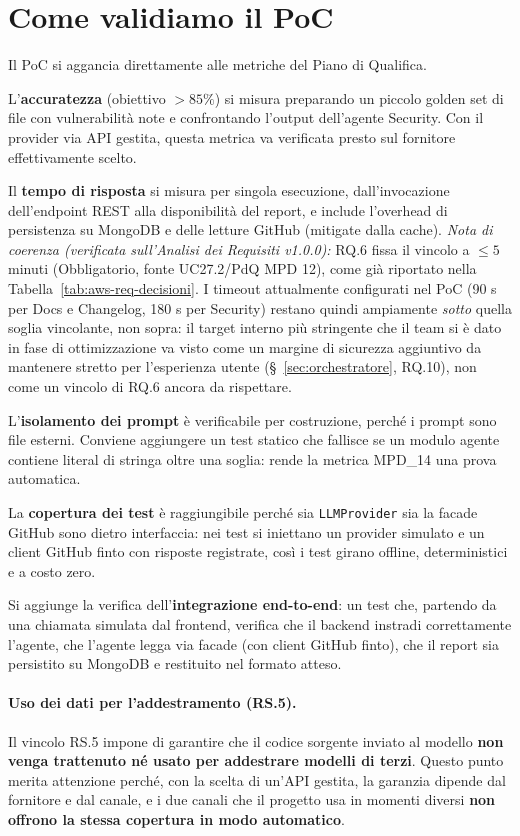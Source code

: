 \documentclass[11pt,a4paper]{article}
\begin{document}
\section{Come validiamo il PoC}

Il PoC si aggancia direttamente alle metriche del Piano di Qualifica.

L'\textbf{accuratezza} (obiettivo $>85\%$) si misura preparando un piccolo golden set di file con vulnerabilità note e confrontando l'output dell'agente Security. Con il provider via API gestita, questa metrica va verificata presto sul fornitore effettivamente scelto.

Il \textbf{tempo di risposta} si misura per singola esecuzione, dall'invocazione dell'endpoint REST alla disponibilità del report, e include l'overhead di persistenza su MongoDB e delle letture GitHub (mitigate dalla cache). \textit{Nota di coerenza (verificata sull'Analisi dei Requisiti v1.0.0):} RQ.6 fissa il vincolo a $\leq 5$ minuti (Obbligatorio, fonte UC27.2/PdQ MPD 12), come già riportato nella Tabella~\ref{tab:aws-req-decisioni}. I timeout attualmente configurati nel PoC (90 s per Docs e Changelog, 180 s per Security) restano quindi ampiamente \emph{sotto} quella soglia vincolante, non sopra: il target interno più stringente che il team si è dato in fase di ottimizzazione va visto come un margine di sicurezza aggiuntivo da mantenere stretto per l'esperienza utente (\S~\ref{sec:orchestratore}, RQ.10), non come un vincolo di RQ.6 ancora da rispettare.

L'\textbf{isolamento dei prompt} è verificabile per costruzione, perché i prompt sono file esterni. Conviene aggiungere un test statico che fallisce se un modulo agente contiene literal di stringa oltre una soglia: rende la metrica MPD\_14 una prova automatica.

La \textbf{copertura dei test} è raggiungibile perché sia \texttt{LLMProvider} sia la facade GitHub sono dietro interfaccia: nei test si iniettano un provider simulato e un client GitHub finto con risposte registrate, così i test girano offline, deterministici e a costo zero.

Si aggiunge la verifica dell'\textbf{integrazione end-to-end}: un test che, partendo da una chiamata simulata dal frontend, verifica che il backend instradi correttamente l'agente, che l'agente legga via facade (con client GitHub finto), che il report sia persistito su MongoDB e restituito nel formato atteso.

\paragraph{Uso dei dati per l'addestramento (RS.5).} Il vincolo RS.5 impone di garantire che il codice sorgente inviato al modello \textbf{non venga trattenuto né usato per addestrare modelli di terzi}. Questo punto merita attenzione perché, con la scelta di un'API gestita, la garanzia dipende dal fornitore e dal canale, e i due canali che il progetto usa in momenti diversi \textbf{non offrono la stessa copertura in modo automatico}.
\end{document}
